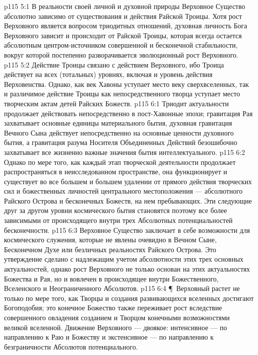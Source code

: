 \vs p115 5:1 В реальности своей личной и духовной природы Верховное Существо абсолютно зависимо от существования и действия Райской Троицы. Хотя рост Верховного является вопросом триодитных отношений, духовная личность Бога Верховного зависит и происходит от Райской Троицы, которая всегда остается абсолютным центром\hyp{}источником совершенной и бесконечной стабильности, вокруг которой постепенно разворачивается эволюционный рост Верховного.
\vs p115 5:2 Действие Троицы связано с действием Верховного, ибо Троица действует на всех (тотальных) уровнях, включая и уровень действия Верховенства. Однако, как век Хавоны уступает место веку сверхвселенных, так и различимое действие Троицы как непосредственного творца уступает место творческим актам детей Райских Божеств.
\vs p115 6:1 Триодит актуальности продолжает действовать непосредственно в пост\hyp{}Хавонные эпохи; гравитация Рая захватывает основные единицы материального бытия, духовная гравитация Вечного Сына действует непосредственно на основные ценности духовного бытия, а гравитация разума Носителя Объединенных Действий безошибочно захватывает все жизненно важные значения бытия интеллектуального.
\vs p115 6:2 Однако по мере того, как каждый этап творческой деятельности продолжает распространяться в неисследованном пространстве, она функционирует и существует во все большем и большем удалении от прямого действия творческих сил и божественных личностей центрального местоположения --- абсолютного Райского Острова и бесконечных Божеств, на нем пребывающих. Эти следующие друг за другом уровни космического бытия становятся поэтому все более зависимыми от происходящего внутри трех Абсолютных потенциальностей бесконечности.
\vs p115 6:3 Верховное Существо заключает в себе возможности для космического служения, которые не явлены очевидно в Вечном Сыне, Бесконечном Духе или безличных реальностях Райского Острова. Это утверждение сделано с надлежащим учетом абсолютности этих трех основных актуальностей, однако рост Верховного не только основан на этих актуальностях Божества и Рая, но и вовлечен в происходящее внутри Божественного, Вселенского и Неограниченного Абсолютов.
\vs p115 6:4 \P\ Верховный растет не только по мере того, как Творцы и создания развивающихся вселенных достигают Богоподобия; это конечное Божество также переживает рост вследствие совершенного овладения созданием и Творцом конечными возможностями великой вселенной. Движение Верховного --- двоякое: интенсивное --- по направлению к Раю и Божеству и экстенсивное --- по направлению к безграничности Абсолютов потенциального.
